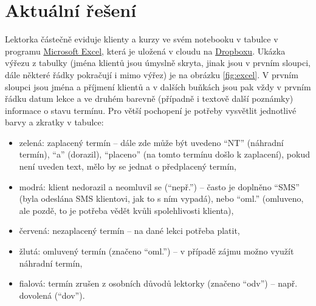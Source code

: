 \chapter{Aktuální řešení}\label{aktualni-reseni}
Lektorka částečně eviduje klienty a kurzy ve svém notebooku v tabulce v programu \href{https://products.office.com/cs-cz/excel}{Microsoft Excel}, která je uložená v cloudu na \href{https://www.dropbox.com/}{Dropboxu}. Ukázka výřezu z tabulky (jména klientů jsou úmyslně skryta, jinak jsou v prvním sloupci, dále některé řádky pokračují i mimo výřez) je na obrázku \ref{fig:excel}. V prvním sloupci jsou jména a příjmení klientů a v dalších buňkách jsou pak vždy v prvním řádku datum lekce a ve druhém barevně (případně i textově další poznámky) informace o stavu termínu. Pro větší pochopení je potřeby vysvětlit jednotlivé barvy a zkratky v tabulce:
    \begin{itemize}
      \item zelená: zaplacený termín -- dále zde může být uvedeno \enquote{NT} (náhradní termín), \enquote{a} (dorazil), \enquote{placeno} (na tomto termínu došlo k zaplacení), pokud není uveden text, mělo by se jednat o předplacený termín,
      \item modrá: klient nedorazil a neomluvil se (\enquote{nepř.}) -- často je doplněno \enquote{SMS} (byla odeslána SMS klientovi, jak to s ním vypadá), nebo \enquote{oml.} (omluveno, ale pozdě, to je potřeba vědět kvůli spolehlivosti klienta),
      \item červená: nezaplacený termín -- na dané lekci potřeba platit,
      \item žlutá: omluvený termín (značeno \enquote{oml.}) -- v případě zájmu možno využít náhradní termín,
      \item fialová: termín zrušen z osobních důvodů lektorky (značeno \enquote{odv}) -- např. dovolená (\enquote{dov}).
    \end{itemize}


